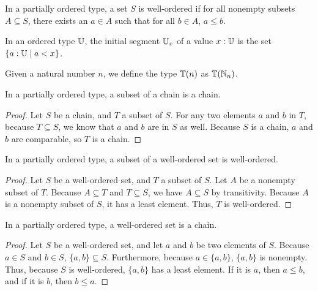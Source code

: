 \documentclass[../../math.tex]{subfiles}
\begin{document}
\begin{definition}
    In a partially ordered type, a set $S$ is well-ordered if for all nonempty
    subsets $A \subseteq S$, there exists an $a \in A$ such that for all $b \in
    A$, $a \leq b$.
\end{definition}

\begin{definition}
    In an ordered type $\mathbb{U}$, the initial segment $\mathbb{U}_x$ of a value $x : \mathbb{U}$ is
    the set $\{a : \mathbb{U} \mid a < x\}$.
\end{definition}

\begin{definition}
    Given a natural number $n$, we define the type $\mathbb{T}(n)$ as $\mathbb{T}(\mathbb{N}_n)$.
\end{definition}

\begin{theorem}
    In a partially ordered type, a subset of a chain is a chain.
\end{theorem}
\begin{proof}
    Let $S$ be a chain, and $T$ a subset of $S$.  For any two elements $a$ and
    $b$ in $T$, because $T \subseteq S$, we know that $a$ and $b$ are in $S$ as
    well.  Because $S$ is a chain, $a$ and $b$ are comparable, so $T$ is a
    chain.
\end{proof}

\begin{theorem}
    In a partially ordered type, a subset of a well-ordered set is well-ordered.
\end{theorem}
\begin{proof}
    Let $S$ be a well-ordered set, and $T$ a subset of $S$.  Let $A$ be a
    nonempty subset of $T$.  Because $A \subseteq T$ and $T \subseteq S$, we
    have $A \subseteq S$ by transitivity.  Because $A$ is a nonempty subset of
    $S$, it has a least element.  Thus, $T$ is well-ordered.
\end{proof}

\begin{theorem}
    In a partially ordered type, a well-ordered set is a chain.
\end{theorem}
\begin{proof}
    Let $S$ be a well-ordered set, and let $a$ and $b$ be two elements of $S$.
    Because $a \in S$ and $b \in S$, $\{a, b\} \subseteq S$.  Furthermore,
    because $a \in \{a, b\}$, $\{a, b\}$ is nonempty.  Thus, because $S$ is
    well-ordered, $\{a, b\}$ has a least element.  If it is $a$, then $a \leq
    b$, and if it is $b$, then $b \leq a$.
\end{proof}
\end{document}
